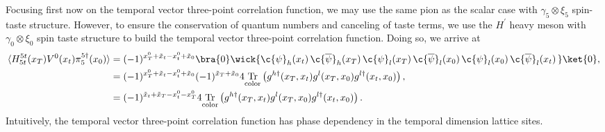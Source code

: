 Focusing first now on the temporal vector three-point correlation function, we may use the same pion as the scalar case with $\gamma_5 \otimes \xi_5$ spin-taste structure.  However, to ensure the conservation of quantum numbers and canceling of taste terms, we use the $H^\prime$ heavy meson with $\gamma_0 \otimes \xi_0$ spin taste structure to build the temporal vector three-point correlation function.  Doing so, we arrive at
\begin{equation}\label{eq:tvector3ptderive}
\begin{split}
\langle H^{5t}_{5t}(x_T)V^{0}(x_t)\pi^{5\dagger}_5(x_0)\rangle &= (-1)^{x^0_T+\tilde{x}_t - x^0_t + \tilde{x}_0}
    \bra{0}\wick{
    \c{\psi}_h(x_t)\, \c{\overline{\psi}}_h(x_T)\,  \c{\psi}_l(x_T)\, \c{\overline{\psi}}_l(x_0)\,   \c{\psi}_l(x_0)\, \c{\overline{\psi}}_l(x_t)\, }\ket{0},\\
    &= (-1)^{x^0_T+\tilde{x}_t - x^0_t + \tilde{x}_0}(-1)^{\tilde{x}_T+\tilde{x}_0} 
    4\underset{\mathrm{color}}{\mathrm{Tr}} \left( g^{h\dagger}(x_T,x_t)g^l(x_T,x_0)g^{l\dagger}(x_t,x_0)\right),\\
    &= (-1)^{\tilde{x}_t+\tilde{x}_T-x^0_t - x^0_T}
 4\underset{\mathrm{color}}{\mathrm{Tr}} \left( g^{h\dagger}(x_T,x_t)g^l(x_T,x_0)g^{l\dagger}(x_t,x_0)\right).
\end{split}
\end{equation}
Intuitively, the temporal vector three-point correlation function has phase dependency in the temporal dimension lattice sites.  

